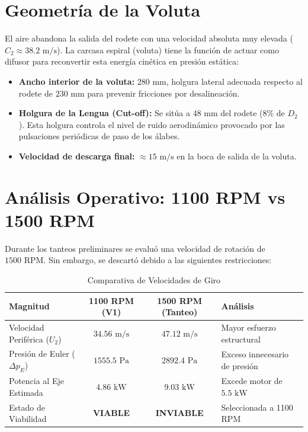 \documentclass[12pt,a4paper]{article}
\begin{document}
\section{Geometría de la Voluta}
El aire abandona la salida del rodete con una velocidad absoluta muy elevada ($C_2 \approx 38.2\text{ m/s}$). La carcasa espiral (voluta) tiene la función de actuar como difusor para reconvertir esta energía cinética en presión estática:

\begin{itemize}
    \item \textbf{Ancho interior de la voluta:} $280\text{ mm}$, holgura lateral adecuada respecto al rodete de $230\text{ mm}$ para prevenir fricciones por desalineación.
    \item \textbf{Holgura de la Lengua (Cut-off):} Se sitúa a $48\text{ mm}$ del rodete ($8\%$ de $D_2$). Esta holgura controla el nivel de ruido aerodinámico provocado por las pulsaciones periódicas de paso de los álabes.
    \item \textbf{Velocidad de descarga final:} $\approx 15\text{ m/s}$ en la boca de salida de la voluta.
\end{itemize}

\section{Análisis Operativo: 1100 RPM vs 1500 RPM}
Durante los tanteos preliminares se evaluó una velocidad de rotación de $1500\text{ RPM}$. Sin embargo, se descartó debido a las siguientes restricciones:

\begin{table}[H]
\centering
\caption{Comparativa de Velocidades de Giro}
\begin{tabular}{lccl}
\toprule
\textbf{Magnitud} & \textbf{1100 RPM (V1)} & \textbf{1500 RPM (Tanteo)} & \textbf{Análisis} \\
\midrule
Velocidad Periférica ($U_2$) & $34.56\text{ m/s}$ & $47.12\text{ m/s}$ & Mayor esfuerzo estructural \\
Presión de Euler ($\Delta p_E$) & $1555.5\text{ Pa}$ & $2892.4\text{ Pa}$ & Exceso innecesario de presión \\
Potencia al Eje Estimada & $4.86\text{ kW}$ & $9.03\text{ kW}$ & Excede motor de $5.5\text{ kW}$ \\
Estado de Viabilidad & \textbf{VIABLE} & \textbf{INVIABLE} & Seleccionada a 1100 RPM \\
\bottomrule
\end{tabular}
\end{table}
\end{document}
